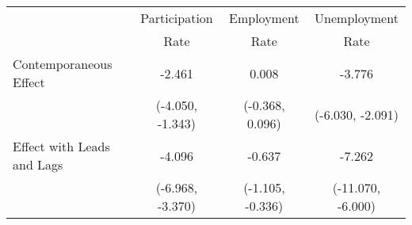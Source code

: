 \begin{tabular}{l|c|c|c}
\hline
\hline
& Participation & Employment & Unemployment \\
& Rate          & Rate       & Rate \\
\hline
Contemporaneous Effect
& -2.461 & 0.008 & -3.776 \\
& {\scriptsize (-4.050, -1.343)}& {\scriptsize (-0.368, 0.096)}& {\scriptsize (-6.030, -2.091)}\\ [0.1cm]
\hline
Effect with Leads and Lags
& -4.096 & -0.637 & -7.262 \\
& {\scriptsize (-6.968, -3.370)}& {\scriptsize (-1.105, -0.336)}& {\scriptsize (-11.070, -6.000)}\\ [0.1cm]
\hline
\hline
\end{tabular}

